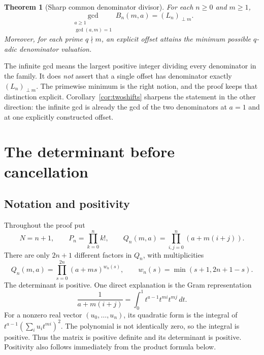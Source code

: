 \documentclass[11pt,a4paper]{article}
\numberwithin{equation}{section}
\newtheorem{theorem}{Theorem}[section]
\theoremstyle{definition}
\theoremstyle{remark}
\begin{document}
\begin{theorem}[Sharp common denominator divisor]\label{thm:gcd}
For each $n\geq0$ and $m\geq1$,
\begin{equation}\label{eq:gcd}
 \boxed{\displaystyle
 \gcd_{\substack{a\geq1\\\gcd(a,m)=1}} B_n(m,a)=(L_n)_{\perp m}.}
\end{equation}
Moreover, for each prime $q\nmid m$, an explicit offset attains the minimum possible $q$-adic denominator valuation.
\end{theorem}

The infinite gcd means the largest positive integer dividing every denominator in the family. It does \emph{not} assert that a single offset has denominator exactly $(L_n)_{\perp m}$. The primewise minimum is the right notion, and the proof keeps that distinction explicit. Corollary~\ref{cor:twoshifts} sharpens the statement in the other direction: the infinite gcd is already the gcd of the two denominators at $a=1$ and at one explicitly constructed offset.

\section{The determinant before cancellation}\label{sec:cauchy}

\subsection{Notation and positivity}
Throughout the proof put
\[
 N=n+1,\qquad P_n=\prod_{k=0}^n k!,\qquad
 Q_n(m,a)=\prod_{i,j=0}^n(a+m(i+j)).
\]
There are only $2n+1$ different factors in $Q_n$, with multiplicities
\begin{equation}\label{eq:Qcompressed}
 Q_n(m,a)=\prod_{s=0}^{2n}(a+ms)^{w_n(s)},
 \qquad w_n(s)=\min(s+1,2n+1-s).
\end{equation}
The determinant is positive. One direct explanation is the Gram representation
\[
 \frac1{a+m(i+j)}=\int_0^1 t^{a-1}t^{mi}t^{mj}\,dt.
\]
For a nonzero real vector $(u_0,\ldots,u_n)$, its quadratic form is the integral of
$t^{a-1}(\sum_i u_it^{mi})^2$. The polynomial is not identically zero, so the integral is positive. Thus the matrix is positive definite and its determinant is positive. Positivity also follows immediately from the product formula below.
\end{document}
